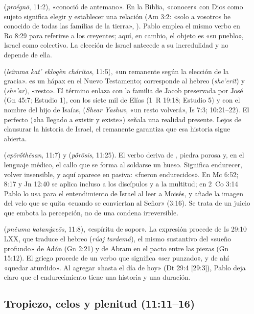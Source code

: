 \textbf{} (\emph{proégnō}, 11:2), «conoció de antemano». En la Biblia, «conocer» con Dios como sujeto significa elegir y establecer una relación (Am 3:2: «solo a vosotros he conocido de todas las familias de la tierra», ). Pablo emplea el mismo verbo en Ro 8:29 para referirse a los creyentes; aquí, en cambio, el objeto es «su pueblo», Israel como colectivo. La elección de Israel antecede a su incredulidad y no depende de ella.

\textbf{} (\emph{leîmma kat' eklogḕn cháritos}, 11:5), «un remanente según la elección de la gracia».  es un hápax en el Nuevo Testamento; corresponde al hebreo  (\emph{she'erit}) y  (\emph{she'ar}), «resto». El término enlaza con la familia de Jacob preservada por José (Gn 45:7; Estudio 1), con los siete mil de Elías (1~R 19:18; Estudio 5) y con el nombre del hijo de Isaías,  (\emph{Shear Yashuv}, «un resto volverá», Is 7:3; 10:21--22). El perfecto  («ha llegado a existir y existe») señala una realidad presente. Lejos de clausurar la historia de Israel, el remanente garantiza que esa historia sigue abierta.

\textbf{} (\emph{epōrṓthēsan}, 11:7) y \textbf{} (\emph{pṓrōsis}, 11:25). El verbo  deriva de , piedra porosa y, en el lenguaje médico, el callo que se forma al soldarse un hueso. Significa endurecer, volver insensible, y aquí aparece en pasiva: «fueron endurecidos». En Mc 6:52; 8:17 y Jn 12:40 se aplica incluso a los discípulos y a la multitud; en 2~Co 3:14 Pablo lo usa para el entendimiento de Israel al leer a Moisés, y añade la imagen del velo que se quita «cuando se conviertan al Señor» (3:16). Se trata de un juicio que embota la percepción, no de una condena irreversible.

\textbf{} (\emph{pnêuma katanýxeōs}, 11:8), «espíritu de sopor». La expresión procede de Is 29:10 LXX, que traduce el hebreo  (\emph{rúaj tardemá}), el mismo sustantivo del «sueño profundo» de Adán (Gn 2:21) y de Abram en el pacto entre las piezas (Gn 15:12). El griego  procede de un verbo que significa «ser punzado», y de ahí «quedar aturdido». Al agregar «hasta el día de hoy» (Dt 29:4 [29:3]), Pablo deja claro que el endurecimiento tiene una historia y una duración.

\subsection{Tropiezo, celos y plenitud (11:11--16)}

